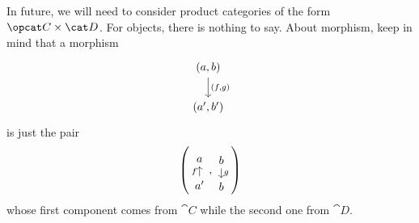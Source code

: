 In future, we will need to consider product categories of the form
\(\opcat C \times \cat D\). For objects, there is nothing to say. About
morphism, keep in mind that a morphism
\[\begin{tikzcd} (a, b) \ar["{(f, g)}", d] \\ (a', b')\end{tikzcd}\]
is just the pair
\[\left(\begin{tikzcd}[row sep=small] a \\ a' \ar["f",
      u] \end{tikzcd}, \begin{tikzcd}[row sep=small] b \ar["g", d] \\
      b \end{tikzcd}\right)\] whose first component comes from
\(\cat C\) while the second one from \(\cat D\).

